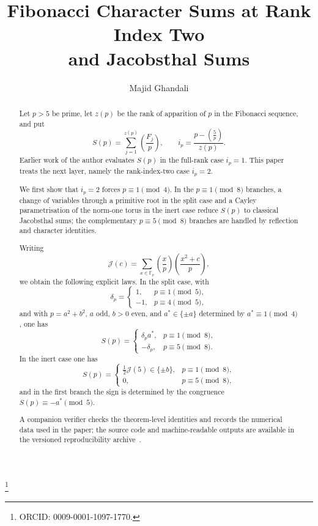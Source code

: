 \documentclass[11pt]{amsart}
\theoremstyle{plain}
\theoremstyle{definition}
\newcommand{\leg}[2]{\left(\frac{#1}{#2}\right)}
\newcommand{\Jac}{\mathcal{J}}
\begin{document}
\title[Index-two Fibonacci character sums]{Fibonacci Character Sums at Rank Index Two\\and Jacobsthal Sums}

\author{Majid Ghandali}
\address{Independent Researcher, Tehran, Iran}
\thanks{ORCID: 0009-0001-1097-1770.}
\date{}

\begin{abstract}
Let $p>5$ be prime, let $z(p)$ be the rank of apparition of $p$
in the Fibonacci sequence, and put
\[
  S(p)=\sum_{j=1}^{z(p)}\leg{F_j}{p},
  \qquad
  i_p=\frac{p-\leg{5}{p}}{z(p)}.
\]
Earlier work of the author evaluates $S(p)$ in the full-rank case
$i_p=1$.  This paper treats the next layer, namely the rank-index-two
case $i_p=2$.

We first show that $i_p=2$ forces $p\equiv1\pmod4$.  In the
$p\equiv1\pmod8$ branches, a change of variables through a primitive
root in the split case and a Cayley parametrisation of the norm-one
torus in the inert case reduce $S(p)$ to classical Jacobsthal sums; the
complementary $p\equiv5\pmod8$ branches are handled by reflection and
character identities.

Writing
\[
  \Jac(c)=\sum_{x\in\mathbb F_p}\leg{x}{p}\leg{x^2+c}{p},
\]
we obtain the following explicit laws.  In the split case, with
\[
  \delta_p=
  \begin{cases}
  1,&p\equiv1\pmod5,\\
  -1,&p\equiv4\pmod5,
  \end{cases}
\]
and with $p=a^2+b^2$, $a$ odd, $b>0$ even, and
$a^{*}\in\{\pm a\}$ determined by $a^{*}\equiv1\pmod4$, one has
\[
  S(p)=
  \begin{cases}
    \delta_p a^{*},&p\equiv1\pmod8,\\
    -\delta_p,&p\equiv5\pmod8.
  \end{cases}
\]
In the inert case one has
\[
  S(p)=
  \begin{cases}
    \displaystyle \frac12\Jac(5)\in\{\pm b\},&p\equiv1\pmod8,\\[4pt]
    0,&p\equiv5\pmod8,
  \end{cases}
\]
and in the first branch the sign is determined by the congruence
$S(p)\equiv -a^{*}\pmod5$.

A companion verifier checks the theorem-level identities and records
the numerical data used in the paper; the source code and
machine-readable outputs are available in the versioned reproducibility
archive~\cite{ghandaliIndex2Archive}.
\end{abstract}
\end{document}
